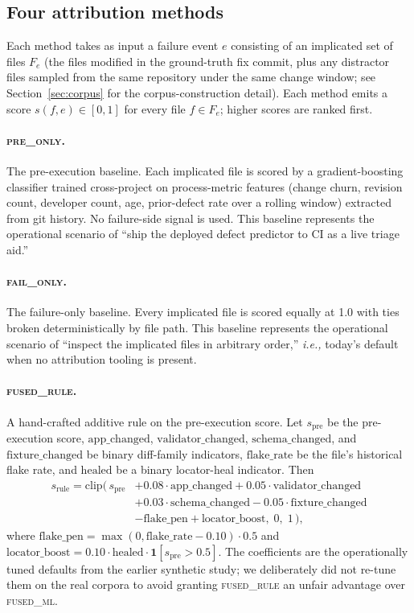 \documentclass[preprint,12pt]{elsarticle}
\begin{document}
\subsection{Four attribution methods}
\label{sec:methods-methods}

Each method takes as input a failure event $e$ consisting of an implicated set of files $F_e$ (the files modified in the ground-truth fix commit, plus any distractor files sampled from the same repository under the same change window; see Section~\ref{sec:corpus} for the corpus-construction detail). Each method emits a score $s(f, e) \in [0, 1]$ for every file $f \in F_e$; higher scores are ranked first.

\paragraph{\textsc{pre\_only}.} The pre-execution baseline. Each implicated file is scored by a gradient-boosting classifier trained cross-project on process-metric features (change churn, revision count, developer count, age, prior-defect rate over a rolling window) extracted from git history. No failure-side signal is used. This baseline represents the operational scenario of ``ship the deployed defect predictor to CI as a live triage aid.''

\paragraph{\textsc{fail\_only}.} The failure-only baseline. Every implicated file is scored equally at 1.0 with ties broken deterministically by file path. This baseline represents the operational scenario of ``inspect the implicated files in arbitrary order,'' \emph{i.e.,} today's default when no attribution tooling is present.

\paragraph{\textsc{fused\_rule}.} A hand-crafted additive rule on the pre-execution score. Let $s_{\mathrm{pre}}$ be the pre-execution score, $\mathrm{app\_changed}$, $\mathrm{validator\_changed}$, $\mathrm{schema\_changed}$, and $\mathrm{fixture\_changed}$ be binary diff-family indicators, $\mathrm{flake\_rate}$ be the file's historical flake rate, and $\mathrm{healed}$ be a binary locator-heal indicator. Then
\begin{align*}
s_{\mathrm{rule}} = \mathrm{clip}\big(\, s_{\mathrm{pre}} & + 0.08 \cdot \mathrm{app\_changed} + 0.05 \cdot \mathrm{validator\_changed} \\
& + 0.03 \cdot \mathrm{schema\_changed} - 0.05 \cdot \mathrm{fixture\_changed} \\
& - \mathrm{flake\_pen} + \mathrm{locator\_boost},\; 0,\; 1 \,\big),
\end{align*}
where $\mathrm{flake\_pen} = \max(0, \mathrm{flake\_rate} - 0.10) \cdot 0.5$ and $\mathrm{locator\_boost} = 0.10 \cdot \mathrm{healed} \cdot \mathbf{1}[s_{\mathrm{pre}} > 0.5]$. The coefficients are the operationally tuned defaults from the earlier synthetic study; we deliberately did not re-tune them on the real corpora to avoid granting \textsc{fused\_rule} an unfair advantage over \textsc{fused\_ml}.
\end{document}
